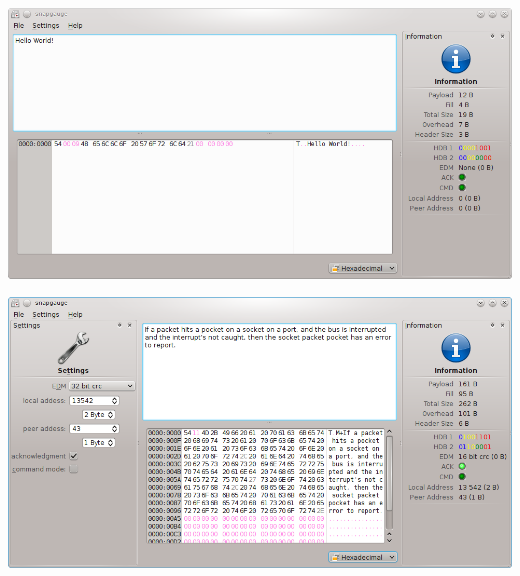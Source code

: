 \begin{frame}[fragile]
\begin{center}
 \includegraphics[scale=0.4]{images/snapgauge_2.png}
\end{center}
\end{frame}

\begin{frame}[fragile]
\begin{center}
 \includegraphics[scale=0.4]{images/snapgauge_3.png}
\end{center}
\end{frame}


